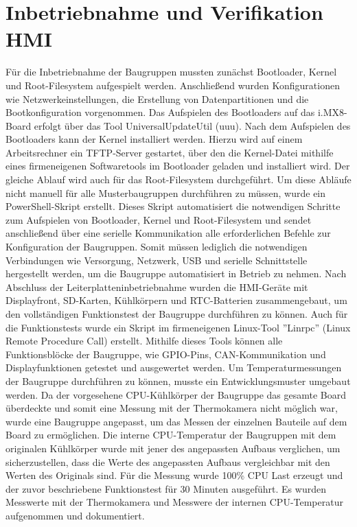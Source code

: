 \documentclass[praktikum,german]{hgbthesis}
\begin{document}
\section{Inbetriebnahme und Verifikation HMI}
Für die Inbetriebnahme der Baugruppen mussten zunächst Bootloader, Kernel und Root-Filesystem aufgespielt werden. Anschließend wurden Konfigurationen wie Netzwerkeinstellungen, die Erstellung von Datenpartitionen und die Bootkonfiguration vorgenommen. Das Aufspielen des Bootloaders auf das i.MX8-Board erfolgt über das Tool UniversalUpdateUtil (uuu). Nach dem Aufspielen des Bootloaders kann der Kernel installiert werden. Hierzu wird auf einem Arbeitsrechner ein TFTP-Server gestartet, über den die Kernel-Datei mithilfe eines firmeneigenen Softwaretools im Bootloader geladen und installiert wird. Der gleiche Ablauf wird auch für das Root-Filesystem durchgeführt. 
Um diese Abläufe nicht manuell für alle Musterbaugruppen durchführen zu müssen, wurde ein PowerShell-Skript erstellt. Dieses Skript automatisiert die notwendigen Schritte zum Aufspielen von Bootloader, Kernel und Root-Filesystem und sendet anschließend über eine serielle Kommunikation alle erforderlichen Befehle zur Konfiguration der Baugruppen. Somit müssen lediglich die notwendigen Verbindungen wie Versorgung, Netzwerk, USB und serielle Schnittstelle hergestellt werden, um die Baugruppe automatisiert in Betrieb zu nehmen. Nach Abschluss der Leiterplatteninbetriebnahme wurden die HMI-Geräte mit Displayfront, SD-Karten, Kühlkörpern und RTC-Batterien zusammengebaut, um den vollständigen Funktionstest der Baugruppe durchführen zu können. Auch für die Funktionstests wurde ein Skript im firmeneigenen Linux-Tool ''Linrpc'' (Linux Remote Procedure Call) erstellt. Mithilfe dieses Tools können alle Funktionsblöcke der Baugruppe, wie GPIO-Pins, CAN-Kommunikation und Displayfunktionen getestet und ausgewertet werden.
Um Temperaturmessungen der Baugruppe durchführen zu können, musste ein Entwicklungsmuster umgebaut werden. Da der vorgesehene CPU-Kühlkörper der Baugruppe das gesamte Board überdeckte und somit eine Messung mit der Thermokamera nicht möglich war, wurde eine Baugruppe angepasst, um das Messen der einzelnen Bauteile auf dem Board zu ermöglichen. Die interne CPU-Temperatur der Baugruppen mit dem originalen Kühlkörper wurde mit jener des angepassten Aufbaus verglichen, um sicherzustellen, dass die Werte des angepassten Aufbaus vergleichbar mit den Werten des Originals sind. Für die Messung wurde 100\% CPU Last erzeugt und der zuvor beschriebene Funktionstest für 30 Minuten ausgeführt. Es wurden Messwerte mit der Thermokamera und Messwere der internen CPU-Temperatur aufgenommen und dokumentiert.
\end{document}
